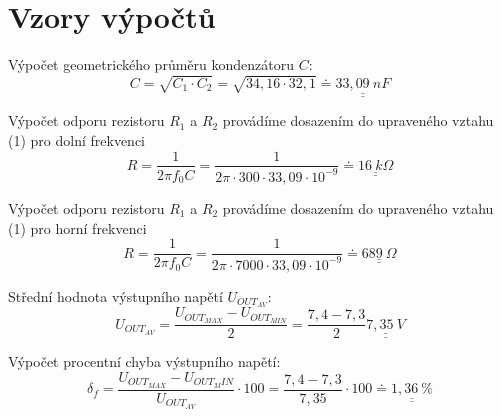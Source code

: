 \section*{Vzory výpočtů}
  
  Výpočet geometrického průměru kondenzátoru $C$:
  \begin{equation}
    C = \sqrt{C_1 \cdot C_2} = \sqrt{34,16 \cdot 32,1} \doteq \underline{\underline{33,09~nF}}
    \nonumber
  \end{equation}
  
  Výpočet odporu rezistoru $R_1$ a $R_2$ provádíme dosazením do upraveného vztahu (1) pro dolní frekvenci 
  \begin{equation}
    R = \dfrac{1}{2\pi f_0 C} = \dfrac{1}{2\pi \cdot 300 \cdot 33,09 \cdot 10^{-9}} \doteq \underline{\underline{16~k\Omega}}
    \nonumber
  \end{equation}   
  
  Výpočet odporu rezistoru $R_1$ a $R_2$ provádíme dosazením do upraveného vztahu (1) pro horní frekvenci 
  \begin{equation}
    R = \dfrac{1}{2\pi f_0 C} = \dfrac{1}{2\pi \cdot 7000 \cdot 33,09 \cdot 10^{-9}} \doteq \underline{\underline{689~\Omega}}
    \nonumber
  \end{equation}     
  
  Střední hodnota výstupního napětí $U_{OUT_{AV}}$:
  \begin{equation}
    U_{OUT_{AV}} = \dfrac{U_{OUT_{MAX}} - U_{OUT_{MIN}}}{2} = \dfrac{7,4 - 7,3}{2}  \underline{\underline{7,35~V}}
    \nonumber
  \end{equation} 
    
  Výpočet procentní chyba výstupního napětí:
  \begin{equation}
    \delta_f = \dfrac{U_{OUT_{MAX}} - U_{OUT_MIN}}{U_{OUT_{AV}}} \cdot 100 = \dfrac{7,4 - 7,3}{7,35} \cdot 100 \doteq \underline{\underline{1,36~\%}}
  	\nonumber
  \end{equation}
 